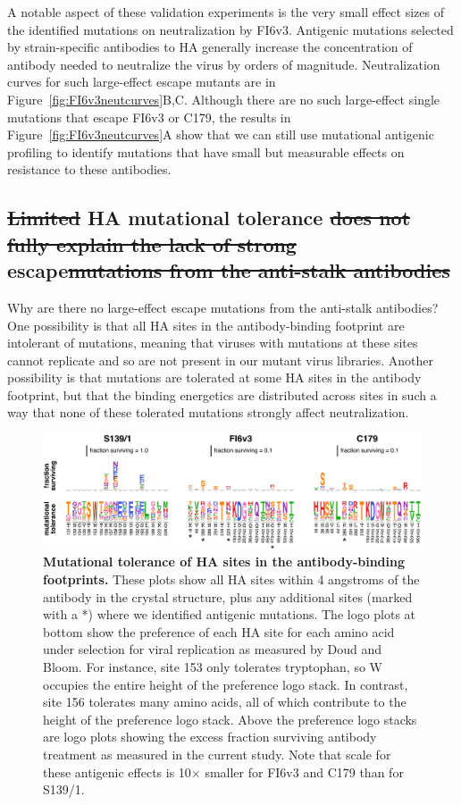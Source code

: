\documentclass[11pt]{article}
\providecommand{\DIFaddtex}[1]{{\protect\color{blue}\uwave{#1}}} %
\providecommand{\DIFdeltex}[1]{{\protect\color{red}\sout{#1}}}                      %
\providecommand{\DIFaddbegin}{} %
\providecommand{\DIFaddend}{} %
\providecommand{\DIFdelbegin}{} %
\providecommand{\DIFdelend}{} %
\providecommand{\DIFadd}[1]{\texorpdfstring{\DIFaddtex{#1}}{#1}} %
\providecommand{\DIFdel}[1]{\texorpdfstring{\DIFdeltex{#1}}{}} %
\begin{document}
A notable aspect of these validation experiments is the very small effect sizes of the identified mutations on neutralization by FI6v3.
Antigenic mutations selected by strain-specific antibodies to HA generally increase the concentration of antibody needed to neutralize the virus by orders of magnitude.
Neutralization curves for such large-effect escape mutants are in Figure~\ref{fig:FI6v3neutcurves}B,C.
Although there are no such large-effect single mutations that escape FI6v3 or C179, the results in Figure~\ref{fig:FI6v3neutcurves}A show that we can still use mutational antigenic profiling to identify mutations that have small but measurable effects on resistance to these antibodies.

\subsection*{\DIFdelbegin \DIFdel{Limited }\DIFdelend HA mutational tolerance \DIFdelbegin \DIFdel{does not fully explain the lack of strong }\DIFdelend \DIFaddbegin \DIFadd{and antibody }\DIFaddend escape\DIFdelbegin \DIFdel{mutations from the anti-stalk antibodies}\DIFdelend }
Why are there no large-effect escape mutations from the anti-stalk antibodies?
One possibility is that all HA sites in the antibody-binding footprint are intolerant of mutations, meaning that viruses with mutations at these sites cannot replicate and so are not present in our mutant virus libraries.
Another possibility is that mutations are tolerated at some HA sites in the antibody footprint, but that the binding energetics are distributed across sites in such a way that none of these tolerated mutations strongly affect neutralization.

\begin{figure}
\centerline{\includegraphics[width=\textwidth]{figs/prefs_fracsurvive/prefs_fracsurvive_logoplots.pdf}}
\caption{
\label{fig:muttolerance}
{\bf Mutational tolerance of HA sites in the antibody-binding footprints.}
These plots show all HA sites within 4 angstroms of the antibody in the crystal structure, plus any additional sites (marked with a *) where we identified antigenic mutations. 
The logo plots at bottom show the preference of each HA site for each amino acid under selection for viral replication as measured by Doud and Bloom\cite{doud2016accurate}.
For instance, site 153 only tolerates tryptophan, so W occupies the entire height of the preference logo stack.
In contrast, site 156 tolerates many amino acids, all of which contribute to the height of the preference logo stack. 
Above the preference logo stacks are logo plots showing the excess fraction surviving antibody treatment as measured in the current study.
Note that scale for these antigenic effects is 10$\times$ smaller for FI6v3 and C179 than for S139/1.
}
\end{figure}
\end{document}
